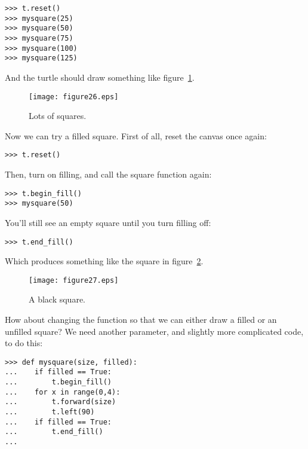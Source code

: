 \begin{Verbatim}[frame=single]
>>> t.reset()
>>> mysquare(25)
>>> mysquare(50)
>>> mysquare(75)
>>> mysquare(100)
>>> mysquare(125)
\end{Verbatim}

And the turtle should draw something like figure~\ref{fig26}.

\begin{figure}
\begin{center}
\texttt{[image: figure26.eps]}
\end{center}
\caption{Lots of squares.}\label{fig26}
\end{figure}

\noindent
Now we can try a filled square.  First of all, reset the canvas once again:

\begin{Verbatim}[frame=single]
>>> t.reset()
\end{Verbatim}

\noindent
Then, turn on filling, and call the square function again:

\begin{Verbatim}[frame=single]
>>> t.begin_fill()
>>> mysquare(50)
\end{Verbatim}

\noindent
You'll still see an empty square until you turn filling off:

\begin{Verbatim}[frame=single]
>>> t.end_fill()
\end{Verbatim}

\noindent
Which produces something like the square in figure~\ref{fig27}.

\begin{figure}
\begin{center}
\texttt{[image: figure27.eps]}
\end{center}
\caption{A black square.}\label{fig27}
\end{figure}

How about changing the function so that we can either draw a filled or an unfilled square? We need another parameter, and slightly more complicated code, to do this:

\begin{Verbatim}[frame=single]
>>> def mysquare(size, filled):
...    if filled == True:
...        t.begin_fill()
...    for x in range(0,4):
...        t.forward(size)
...        t.left(90)
...    if filled == True:
...        t.end_fill()
...
\end{Verbatim}

